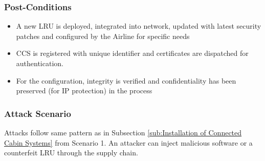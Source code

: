 \subsubsection{Post-Conditions}
\begin{itemize}
	\item A new LRU  is deployed, integrated into network, updated with latest security patches and configured by
	      the Airline for specific needs
	\item CCS is registered with unique identifier and certificates are dispatched for authentication.
	\item For the configuration, integrity is verified and confidentiality has been preserved (for IP protection)
	      in the process
\end{itemize}

\subsubsection{Attack Scenario}

Attacks follow same pattern as in Subsection \ref{sub:Installation of Connected Cabin Systems} from Scenario 1.
An attacker can inject malicious software or a counterfeit LRU through the supply chain.

